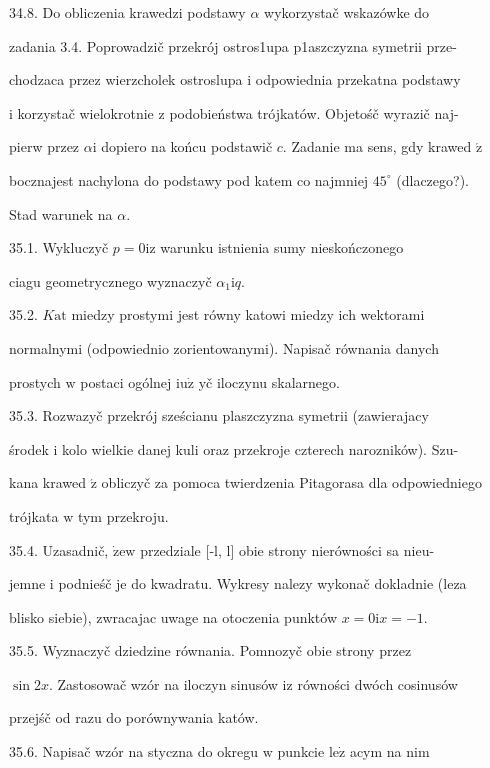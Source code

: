 \documentclass[a4paper,12pt]{article}
\begin{document}
34.8. Do obliczenia krawedzi podstawy $\alpha$ wykorzystač wskazówke do

zadania 3.4. Poprowadzič przekrój ostros1upa p1aszczyzna symetrii prze-

chodzaca przez wierzcholek ostroslupa $\mathrm{i}$ odpowiednia przekatna podstawy

$\mathrm{i}$ korzystač wielokrotnie $\mathrm{z}$ podobieństwa trójkatów. Objetośč wyrazič naj-

pierw przez $\alpha \mathrm{i}$ dopiero na końcu podstawič $c$. Zadanie ma sens, gdy krawed $\acute{\mathrm{z}}$

bocznajest nachylona do podstawy pod katem co najmniej $45^{\circ}$ (dlaczego?).

Stad warunek na $\alpha.$

35.1. Wykluczyč $p = 0 \mathrm{i} \mathrm{z}$ warunku istnienia sumy nieskończonego

ciagu geometrycznego wyznaczyč $\alpha_{1}\mathrm{i}q.$

35.2. $K\mathrm{a}\mathrm{t}$ miedzy prostymi jest równy katowi miedzy ich wektorami

normalnymi (odpowiednio zorientowanymi). Napisač równania danych

prostych $\mathrm{w}$ postaci ogólnej $\mathrm{i}\mathrm{u}\dot{\mathrm{z}}$ yč iloczynu skalarnego.

35.3. Rozwazyč przekrój sześcianu plaszczyzna symetrii (zawierajacy

środek $\mathrm{i}$ kolo wielkie danej kuli oraz przekroje czterech narozników). Szu-

kana krawed $\acute{\mathrm{z}}$ obliczyč za pomoca twierdzenia Pitagorasa dla odpowiedniego

trójkata $\mathrm{w}$ tym przekroju.

35.4. Uzasadnič, $\dot{\mathrm{z}}\mathrm{e}\mathrm{w}$ przedziale [-l, l] obie strony nierówności sa nieu-

jemne $\mathrm{i}$ podnieśč je do kwadratu. Wykresy nalezy wykonač dokladnie (leza

blisko siebie), zwracajac uwage na otoczenia punktów $x=0\mathrm{i}x=-1.$

35.5. Wyznaczyč dziedzine równania. Pomnozyč obie strony przez

$\sin 2x$. Zastosowač wzór na iloczyn sinusów $\mathrm{i}\mathrm{z}$ równości dwóch cosinusów

przejśč od razu do porównywania katów.

35.6. Napisač wzór na styczna do okregu $\mathrm{w}$ punkcie $\mathrm{l}\mathrm{e}\dot{\mathrm{z}}$ acym na nim
\end{document}
